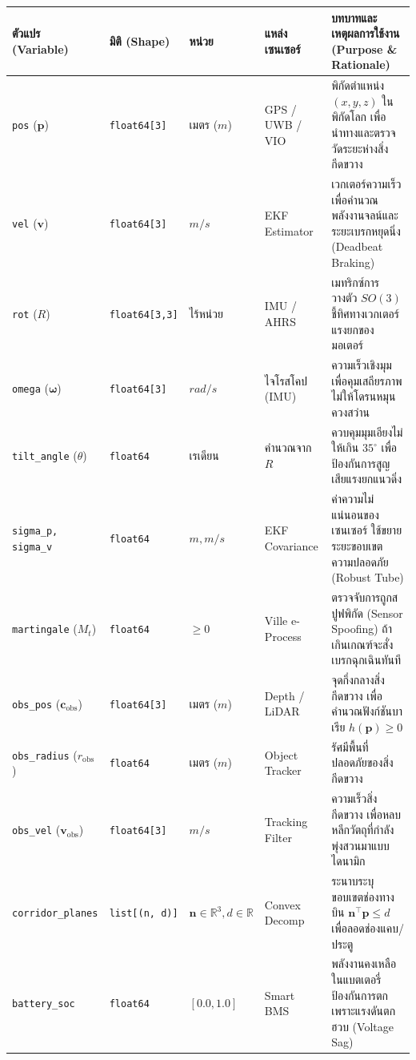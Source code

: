 \documentclass[11pt,a4paper]{article}
\begin{document}
\vspace{2mm}
\noindent
\footnotesize
\begin{tabularx}{\textwidth}{l p{2.0cm} p{1.4cm} p{2.2cm} X}
\toprule
\textbf{ตัวแปร (Variable)} & \textbf{มิติ (Shape)} & \textbf{หน่วย} & \textbf{แหล่งเซนเซอร์} & \textbf{บทบาทและเหตุผลการใช้งาน (Purpose \& Rationale)} \\
\midrule
\texttt{pos} ($\mathbf{p}$) & \texttt{float64[3]} & เมตร ($m$) & GPS / UWB / VIO & พิกัดตำแหน่ง $(x, y, z)$ ในพิกัดโลก เพื่อนำทางและตรวจวัดระยะห่างสิ่งกีดขวาง \\
\texttt{vel} ($\mathbf{v}$) & \texttt{float64[3]} & $m/s$ & EKF Estimator & เวกเตอร์ความเร็ว เพื่อคำนวณพลังงานจลน์และระยะเบรกหยุดนิ่ง (Deadbeat Braking) \\
\texttt{rot} ($R$) & \texttt{float64[3,3]} & ไร้หน่วย & IMU / AHRS & เมทริกซ์การวางตัว $SO(3)$ ชี้ทิศทางเวกเตอร์แรงยกของมอเตอร์ \\
\texttt{omega} ($\boldsymbol{\omega}$) & \texttt{float64[3]} & $rad/s$ & ไจโรสโคป (IMU) & ความเร็วเชิงมุม เพื่อคุมเสถียรภาพไม่ให้โดรนหมุนควงสว่าน \\
\texttt{tilt\_angle} ($\theta$) & \texttt{float64} & เรเดียน & คำนวณจาก $R$ & ควบคุมมุมเอียงไม่ให้เกิน $35^\circ$ เพื่อป้องกันการสูญเสียแรงยกแนวดิ่ง \\
\texttt{sigma\_p, sigma\_v} & \texttt{float64} & $m, m/s$ & EKF Covariance & ค่าความไม่แน่นอนของเซนเซอร์ ใช้ขยายระยะขอบเขตความปลอดภัย (Robust Tube) \\
\texttt{martingale} ($M_t$) & \texttt{float64} & $\ge 0$ & Ville e-Process & ตรวจจับการถูกสปูฟพิกัด (Sensor Spoofing) ถ้าเกินเกณฑ์จะสั่งเบรกฉุกเฉินทันที \\
\texttt{obs\_pos} ($\mathbf{c}_{\text{obs}}$) & \texttt{float64[3]} & เมตร ($m$) & Depth / LiDAR & จุดกึ่งกลางสิ่งกีดขวาง เพื่อคำนวณฟังก์ชันบาเรีย $h(\mathbf{p}) \ge 0$ \\
\texttt{obs\_radius} ($r_{\text{obs}}$) & \texttt{float64} & เมตร ($m$) & Object Tracker & รัศมีพื้นที่ปลอดภัยของสิ่งกีดขวาง \\
\texttt{obs\_vel} ($\mathbf{v}_{\text{obs}}$) & \texttt{float64[3]} & $m/s$ & Tracking Filter & ความเร็วสิ่งกีดขวาง เพื่อหลบหลีกวัตถุที่กำลังพุ่งสวนมาแบบไดนามิก \\
\texttt{corridor\_planes} & \texttt{list[(n, d)]} & $\mathbf{n} \in \mathbb{R}^3, d \in \mathbb{R}$ & Convex Decomp & ระนาบระบุขอบเขตช่องทางบิน $\mathbf{n}^\top \mathbf{p} \le d$ เพื่อลอดช่องแคบ/ประตู \\
\texttt{battery\_soc} & \texttt{float64} & $[0.0, 1.0]$ & Smart BMS & พลังงานคงเหลือในแบตเตอรี่ ป้องกันการตกเพราะแรงดันตกฮวบ (Voltage Sag) \\
\bottomrule
\end{tabularx}
\normalsize
\end{document}
